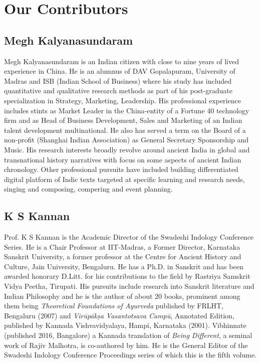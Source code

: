 
\chapter*{Our Contributors }\label{contributors}

\vskip 4pt

\section*{Megh Kalyanasundaram}

\vskip 4pt

Megh Kalyanasundaram is an Indian citizen with close to nine years of lived experience in China. He is an alumnus of DAV Gopalapuram, University of Madras and ISB (Indian School of Business) where his study has included quantitative and qualitative research methods as part of his post-graduate specialization in Strategy, Marketing, Leadership. His professional experience includes stints as Market Leader in the China-entity of a Fortune 40 technology firm and as Head of Business Development, Sales and Marketing of an Indian talent development multinational. He also has served a term on the Board of a non-profit (Shanghai Indian Association) as General Secretary Sponsorship and Music. His research interests broadly revolve around ancient India in global and transnational history narratives with focus on some aspects of ancient Indian chronology. Other professional pursuits have included building differentiated digital platform of Indic texts targeted at specific learning and research needs, singing and composing, compering and event planning.

\section*{K S Kannan}

Prof. K S Kannan is the Academic Director of the Swadeshi Indology Conference Series. He is a Chair Professor at IIT-Madras, a Former Director, Karnataka Sanskrit University, a former professor at the Centre for Ancient History and Culture, Jain University, Bengaluru. He has a Ph.D. in Sanskrit and has been awarded honorary D.Litt. for his contributions to the field by Rastriya Samskrit Vidya Peetha, Tirupati. His pursuits include research into Sanskrit literature and Indian Philosophy and he is the author of about 20 books, prominent among them being \textit{Theoretical Foundations of Ayurveda} published by FRLHT, Bengaluru (2007) and \textit{Virūpākṣa Vasantotsava Campū}, Annotated Edition, published by Kannada Vishvavidyalaya, Hampi, Karnataka (2001). Vibhinnate (published 2016, Bangalore) a Kannada translation of \textit{Being Different}, a seminal work of Rajiv Malhotra, is co-authored by him. He is the General Editor of the Swadeshi Indology Conference Proceedings series of which this is the fifth volume.

